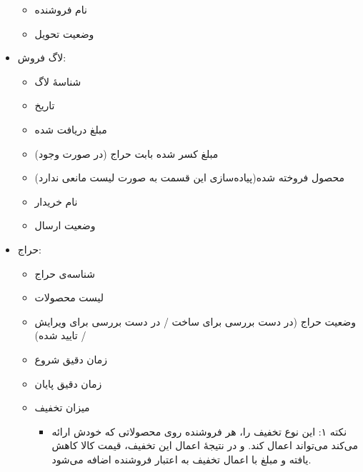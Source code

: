 \documentclass[]{article}
\begin{document}
\begin{itemize}
\begin{itemize}
\item
نام فروشنده

\item
وضعیت تحویل

\end{itemize}

\newpage

\item
لاگ فروش:

\begin{itemize}

\item
شناسهٔ لاگ

\item
تاریخ

\item
مبلغ دریافت شده

\item
مبلغ کسر شده بابت حراج (در صورت وجود)

\item
محصول فروخته شده(پیاده‌سازی این قسمت به صورت لیست مانعی ندارد)

\item
نام خریدار

\item
وضعیت ارسال


\end{itemize}


\item
حراج:

\begin{itemize}

\item
شناسه‌ی حراج 

\item
لیست محصولات

\item
وضعیت حراج (در دست بررسی برای ساخت / در دست بررسی برای ویرایش / تایید شده)

\item
زمان دقیق شروع

\item
زمان دقیق پایان

\item
میزان تخفیف


\begin{itemize}[label = $\blacksquare$]
\item
نکته ۱: این نوع تخفیف را، هر فروشنده روی محصولاتی که خودش ارائه می‌کند می‌تواند اعمال کند. و 
در نتیجهٔ اعمال این تخفیف، قیمت کالا کاهش یافته و مبلغ با اعمال تخفیف به اعتبار فروشنده اضافه می‌شود.


\end{itemize}
\end{itemize}
\end{itemize}
\end{document}
